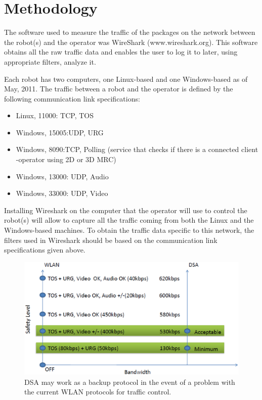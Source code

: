 \documentclass[conference]{ieeeconf}
\begin{document}
\section{Methodology}
The software used to measure the traffic of the packages on the network between the robot(s) and the operator was WireShark (www.wireshark.org). 
This software obtains all the raw traffic data and enables the user to log it to later, using appropriate filters, analyze it. 

Each robot has two computers, one Linux-based and one Windows-based as of May, 2011.
The traffic between a robot and the operator is defined by the following communication link specifications:
\begin{itemize}
  \item Linux, 11000: TCP, TOS
  \item Windows, 15005:UDP, URG
  \item Windows, 8090:TCP, Polling (service that checks if there is a connected client -operator using 2D or 3D MRC)
  \item Windows, 13000: UDP, Audio
  \item Windows, 33000: UDP, Video
\end{itemize}

Installing Wireshark on the computer that the operator will use to control the robot(s) will allow to capture all the traffic coming from both the Linux and the Windows-based machines.
To obtain the traffic data specific to this network, the filters used in Wireshark should be based on the communication link specifications given above. 

\begin{figure}[htp]
\centering
\includegraphics[width=1\columnwidth, scale=0.6]{dsaRoleResults}
\caption{DSA may work as a backup protocol in the event of a problem with the current WLAN protocols for traffic control.}
\label{fig:dsaRoleResults}
\end{figure}
\end{document}
